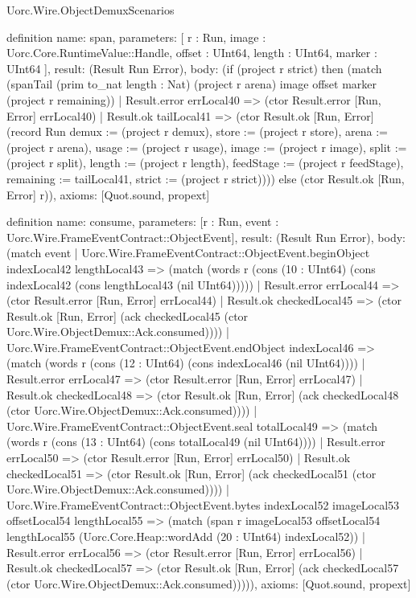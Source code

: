 \begin{lexlean}{Uorc.Wire.ObjectDemuxScenarios}
\begin{semanticmodule}
definition{
  name: span,
  parameters: [
    r : Run,
    image : Uorc.Core.RuntimeValue::Handle,
    offset : UInt64,
    length : UInt64,
    marker : UInt64
  ],
  result: (Result Run Error),
  body: (if (project r strict) then (match (spanTail (prim to_nat length : Nat) (project r arena) image offset marker (project r remaining))
    | Result.error errLocal40 => (ctor Result.error [Run, Error] errLocal40)
    | Result.ok tailLocal41 => (ctor Result.ok [Run, Error] (record Run {demux := (project r demux), store := (project r store), arena := (project r arena), usage := (project r usage), image := (project r image), split := (project r split), length := (project r length), feedStage := (project r feedStage), remaining := tailLocal41, strict := (project r strict)}))) else (ctor Result.ok [Run, Error] r)),
  axioms: [Quot.sound, propext]
}

definition{
  name: consume,
  parameters: [r : Run, event : Uorc.Wire.FrameEventContract::ObjectEvent],
  result: (Result Run Error),
  body: (match event
    | Uorc.Wire.FrameEventContract::ObjectEvent.beginObject indexLocal42 lengthLocal43 => (match (words r (cons (10 : UInt64) (cons indexLocal42 (cons lengthLocal43 (nil UInt64)))))
      | Result.error errLocal44 => (ctor Result.error [Run, Error] errLocal44)
      | Result.ok checkedLocal45 => (ctor Result.ok [Run, Error] (ack checkedLocal45 (ctor Uorc.Wire.ObjectDemux::Ack.consumed))))
    | Uorc.Wire.FrameEventContract::ObjectEvent.endObject indexLocal46 => (match (words r (cons (12 : UInt64) (cons indexLocal46 (nil UInt64))))
      | Result.error errLocal47 => (ctor Result.error [Run, Error] errLocal47)
      | Result.ok checkedLocal48 => (ctor Result.ok [Run, Error] (ack checkedLocal48 (ctor Uorc.Wire.ObjectDemux::Ack.consumed))))
    | Uorc.Wire.FrameEventContract::ObjectEvent.seal totalLocal49 => (match (words r (cons (13 : UInt64) (cons totalLocal49 (nil UInt64))))
      | Result.error errLocal50 => (ctor Result.error [Run, Error] errLocal50)
      | Result.ok checkedLocal51 => (ctor Result.ok [Run, Error] (ack checkedLocal51 (ctor Uorc.Wire.ObjectDemux::Ack.consumed))))
    | Uorc.Wire.FrameEventContract::ObjectEvent.bytes indexLocal52 imageLocal53 offsetLocal54 lengthLocal55 => (match (span r imageLocal53 offsetLocal54 lengthLocal55 (Uorc.Core.Heap::wordAdd (20 : UInt64) indexLocal52))
      | Result.error errLocal56 => (ctor Result.error [Run, Error] errLocal56)
      | Result.ok checkedLocal57 => (ctor Result.ok [Run, Error] (ack checkedLocal57 (ctor Uorc.Wire.ObjectDemux::Ack.consumed))))),
  axioms: [Quot.sound, propext]
}


\end{semanticmodule}
\end{lexlean}
